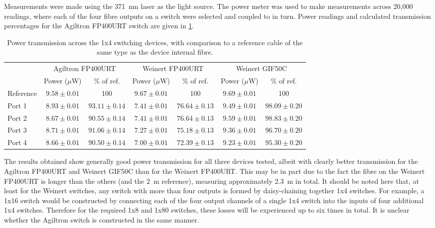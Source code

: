 \documentclass[a4paper,11pt]{article}
\begin{document}
Measurements were made using the 371~nm laser as the light source. The power meter was used to make measurements across 20,000 readings, where each of the four fibre outputs on a switch were selected and coupled to in turn. Power readings and calculated transmission percentages for the Agiltron FP400URT switch are given in \cref{tab:switchpower}.
\begin{table}[h]
\centering
\begin{tabular}{l|cc|cc|cc}
\toprule
\multirow{2}{*}{} & \multicolumn{2}{c|}{Agiltron FP400URT} & \multicolumn{2}{c|}{Weinert FP400URT} & \multicolumn{2}{c}{Weinert GIF50C} \\
			&	Power ($\mu$W) & \% of ref. & Power ($\mu$W) & \% of ref. & Power ($\mu$W) & \% of ref.\\ \midrule
Reference	& $9.58\pm0.01$	& 100  			 & $9.67\pm0.01$ & 100 			  & $9.69\pm0.01$ & 100 \\
Port 1		& $8.93\pm0.01$	& $93.11\pm0.14$ & $7.41\pm0.01$ & $76.64\pm0.13$ & $9.49\pm0.01$ & $98.09\pm0.20$ \\
Port 2		& $8.67\pm0.01$	& $90.55\pm0.14$ & $7.41\pm0.01$ & $76.64\pm0.13$ & $9.59\pm0.01$ & $98.83\pm0.20$ \\
Port 3		& $8.71\pm0.01$	& $91.06\pm0.14$ & $7.27\pm0.01$ & $75.18\pm0.13$ & $9.36\pm0.01$ & $96.70\pm0.20$ \\
Port 4		& $8.66\pm0.01$	& $90.50\pm0.14$ & $7.00\pm0.01$ & $72.39\pm0.13$ & $9.23\pm0.01$ & $95.30\pm0.20$ \\
\bottomrule
\end{tabular}
\caption{Power transmission across the 1x4 switching devices, with comparison to a reference cable of the same type as the device internal fibre.}\label{tab:switchpower}
\end{table}
The results obtained show generally good power transmission for all three devices tested, albeit with clearly better transmission for the Agiltron FP400URT and Weinert GIF50C than for the Weinert FP400URT. This may be in part due to the fact the fibre on the Weinert FP400URT is longer than the others (and the 2~m reference), measuring approximately 2.3~m in total. It should be noted here that, at least for the Weinert switches, any switch with more than four outputs is formed by daisy-chaining together 1x4 switches. For example, a 1x16 switch would be constructed by connecting each of the four output channels of a single 1x4 switch into the inputs of four additional 1x4 switches. Therefore for the required 1x8 and 1x80 switches, these losses will be experienced up to six times in total. It is unclear whether the Agiltron switch is constructed in the same manner.
\end{document}
